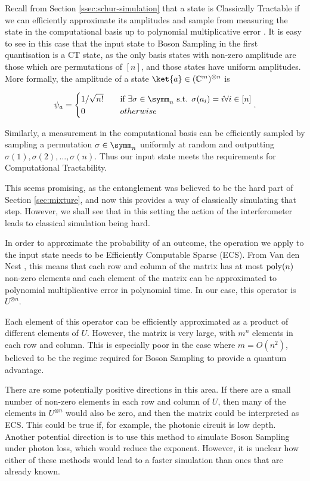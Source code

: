 Recall from Section \ref{ssec:schur-simulation} that a state is Classically Tractable if we can efficiently approximate its amplitudes and sample from measuring the state in the computational basis up to polynomial multiplicative error \cite{vandennest2011}. It is easy to see in this case that the input state to Boson Sampling in the first quantisation is a CT state, as the only basis states with non-zero amplitude are those which are permutations of $[n]$, and those states have uniform amplitudes. More formally, the amplitude of a state $\ket{a}\in(\mathbb{C}^m)^{\otimes n}$ is

\begin{equation}
\psi_a = \begin{cases}1/\sqrt{n!} & \quad \textrm{if } \exists \sigma\in\symm_n \textrm{ s.t. } \sigma(a_i) = i \forall i\in[n]\\0 & \quad{otherwise}\end{cases}.
\end{equation}

Similarly, a measurement in the computational basis can be efficiently sampled by sampling a permutation $\sigma \in \symm_n$ uniformly at random and outputting $\sigma(1), \sigma(2),\dots,\sigma(n)$. Thus our input state meets the requirements for Computational Tractability.

This seems promising, as the entanglement was believed to be the hard part of Section \ref{sec:mixture}, and now this provides a way of classically simulating that step. However, we shall see that in this setting the action of the interferometer leads to classical simulation being hard.

In order to approximate the probability of an outcome, the operation we apply to the input state needs to be Efficiently Computable Sparse (ECS). From Van den Nest \cite{vandennest2011}, this means that each row and column of the matrix has at most $\operatorname{poly}(n)$ non-zero elements and each element of the matrix can be approximated to polynomial multiplicative error in polynomial time. In our case, this operator is $U^{\otimes n}$.

Each element of this operator can be efficiently approximated as a product of different elements of $U$. However, the matrix is very large, with $m^n$ elements in each row and column. This is especially poor in the case where $m = O(n^2)$, believed to be the regime required for Boson Sampling to provide a quantum advantage.

There are some potentially positive directions in this area. If there are a small number of non-zero elements in each row and column of $U$, then many of the elements in $U^{\otimes n}$ would also be zero, and then the matrix could be interpreted as ECS. This could be true if, for example, the photonic circuit is low depth. Another potential direction is to use this method to simulate Boson Sampling under photon loss, which would reduce the exponent. However, it is unclear how either of these methods would lead to a faster simulation than ones that are already known.

